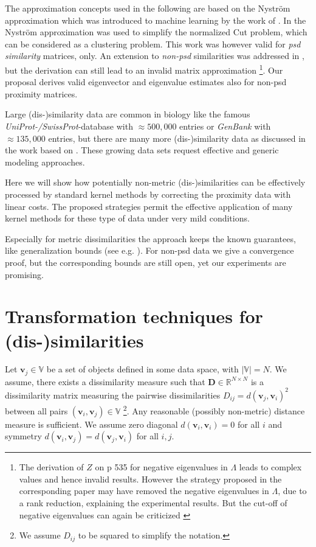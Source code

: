 \documentclass[twoside,11pt]{article}
\renewcommand{\v}[1]{\mathbf{#1}}
\begin{document}
The approximation concepts used in the following are based on the Nystr\"om approximation which was introduced to machine learning by the work of
\cite{DBLP:conf/nips/WilliamsS00}. In \cite{DBLP:journals/pami/FowlkesBCM04} the Nystr\"om approximation was used to simplify the normalized Cut
problem, which can be considered as a clustering problem. This work was however valid for \emph{psd similarity} matrices, only. An extension to
\emph{non-psd} similarities was addressed in \cite{DBLP:conf/eccv/BelongieFCM02}, but the derivation can still lead to an invalid matrix approximation
\footnote{The derivation of $Z$ on p 535 for negative eigenvalues in $\Lambda$ leads to complex values and hence invalid results.
However the strategy proposed in the corresponding paper may have removed the negative eigenvalues in $\Lambda$, due to a rank reduction,
explaining the experimental results. But the cut-off of negative eigenvalues can again be criticized \cite{DBLP:conf/sspr/PekalskaDGB04}}. 
Our proposal derives valid eigenvector and eigenvalue estimates also for non-psd proximity matrices.

Large (dis-)similarity data are common in biology like the famous
\emph{UniProt-/SwissProt}-database with $\approx 500,000$ entries
or \emph{GenBank} with $\approx 135,000$ entries, but there are many more (dis-)similarity data as discussed in the work based 
on \cite{Pekalska2005a,DBLP:journals/tsmc/PekalskaD08}. These growing data sets request effective and generic modeling approaches.

Here we will show how potentially non-metric (dis-)simi\-larities can be effectively processed by standard kernel methods by
correcting the proximity data with linear costs.
The proposed strategies permit the effective application of many kernel methods for these type of data under very mild conditions. 

Especially for metric dissimilarities the approach keeps the known guarantees, like generalization bounds (see e.g. \cite{DBLP:journals/jmlr/DrineasM05}).
For non-psd data we give a convergence proof, but the corresponding bounds are still open, yet our experiments are promising.

\section{Transformation techniques for (dis-)similarities}
\label{sec:trafos}
Let $\v{v}_j \in  \mathbb{V}$ be a set of objects defined in some data space, with $|\mathbb{V}|=N$. 
We assume, there exists a dissimilarity measure such that $\mathbf{D} \in \mathbb{R}^{N \times N}$ is a dissimilarity matrix 
measuring the pairwise dissimilarities $D_{ij}=d(\v{v}_j,\v{v}_i)^2$
between all pairs $(\v{v}_i,\v{v}_j) \in \mathbb{V}$
\footnote{We assume $D_{ij}$ to be squared to simplify the notation.}.
Any reasonable (possibly non-metric) distance measure  is sufficient. 
We assume zero diagonal $d(\v{v}_i,\v{v}_i)=0$ for all $i$ and symmetry $d(\v{v}_i,\v{v}_j)=d(\v{v}_j,\v{v}_i)$
for all $i,j$.
\end{document}
